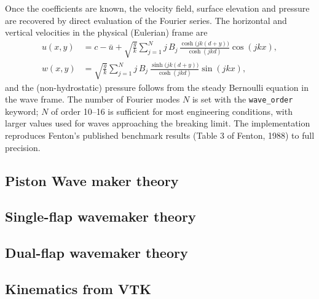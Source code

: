 Once the coefficients are known, the velocity field, surface elevation and pressure are recovered by direct evaluation of the Fourier series. The horizontal and vertical velocities in the physical (Eulerian) frame are
\begin{align}
u(x,y) &= c - \bar{u} + \sqrt{\frac{g}{k}}\sum_{j=1}^{N} j\,B_j\,\frac{\cosh\!\big(jk(d+y)\big)}{\cosh(jkd)}\cos(jkx),\\
w(x,y) &= \sqrt{\frac{g}{k}}\sum_{j=1}^{N} j\,B_j\,\frac{\sinh\!\big(jk(d+y)\big)}{\cosh(jkd)}\sin(jkx),
\end{align}
and the (non-hydrostatic) pressure follows from the steady Bernoulli equation in the wave frame. The number of Fourier modes $N$ is set with the \texttt{wave\_order} keyword; $N$ of order 10--16 is sufficient for most engineering conditions, with larger values used for waves approaching the breaking limit. The implementation reproduces Fenton's published benchmark results (Table 3 of Fenton, 1988) to full precision.

\subsection{Piston Wave maker theory}

\subsection{Single-flap wavemaker theory}

\subsection{Dual-flap wavemaker theory}

\subsection{Kinematics from VTK}
